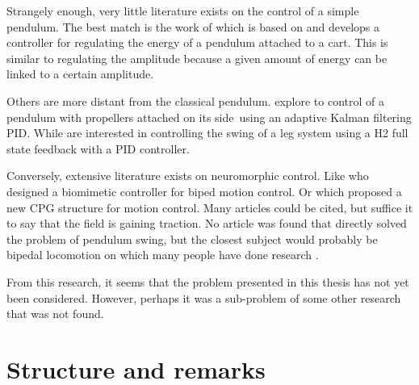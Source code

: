 Strangely enough, very little literature exists on the control of a simple pendulum. The best match is the work of \citet{Pendulum3} which is based on \citet{Pendulum3comp} and develops a controller for regulating the energy of a pendulum attached to a cart. This is similar to regulating the amplitude because a given amount of energy can be linked to a certain amplitude. 

Others are more distant from the classical pendulum. \citet{Pendulum2} explore to control of a pendulum with propellers attached on its side using an adaptive Kalman filtering PID. While \citet{Pendulum1} are interested in controlling the swing of a leg system using a H2 full state feedback with a PID controller.

Conversely, extensive literature exists on neuromorphic control. Like \citet{neuromorph1} who designed a biomimetic controller for biped motion control. Or \citet{cpgmotorpattern} which proposed a new CPG structure for motion control. Many articles could be cited, but suffice it to say that the field is gaining traction. No article was found that directly solved the problem of pendulum swing, but the closest subject would probably be bipedal locomotion on which many people have done research \citep{related2,related5,neuromorph1,related4}.

From this research, it seems that the problem presented in this thesis has not yet been considered. However, perhaps it was a sub-problem of some other research that was not found.

\section{Structure and remarks}

